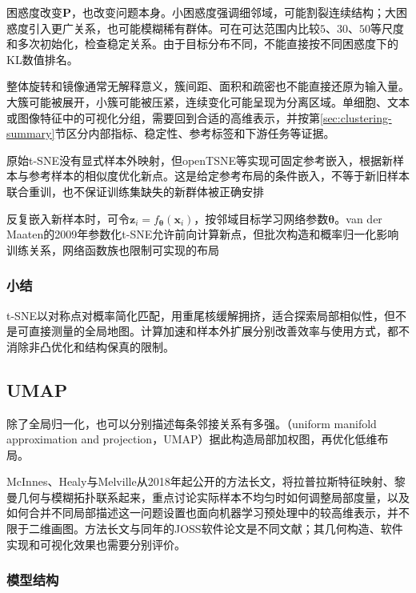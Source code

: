 困惑度改变$\bm{P}$，也改变问题本身。小困惑度强调细邻域，可能割裂连续结构；大困惑度引入更广关系，也可能模糊稀有群体。可在可达范围内比较$5$、$30$、$50$等尺度和多次初始化，检查稳定关系。由于目标分布不同，不能直接按不同困惑度下的KL数值排名。

整体旋转和镜像通常无解释意义，簇间距、面积和疏密也不能直接还原为输入量。大簇可能被展开，小簇可能被压紧，连续变化可能呈现为分离区域。单细胞、文本或图像特征中的可视化分组，需要回到合适的高维表示，并按第\ref{sec:clustering-summary}节区分内部指标、稳定性、参考标签和下游任务等证据。

原始t-SNE没有显式样本外映射，但openTSNE等实现可固定参考嵌入，根据新样本与参考样本的相似度优化新点。这是给定参考布局的条件嵌入，不等于新旧样本联合重训，也不保证训练集缺失的新群体被正确安排

反复嵌入新样本时，可令$\bm{z}_i=f_{\bm{\theta}}(\bm{x}_i)$，按邻域目标学习网络参数$\bm{\theta}$。van der Maaten的2009年参数化t-SNE允许前向计算新点，但批次构造和概率归一化影响训练关系，网络函数族也限制可实现的布局

\subsubsection{小结}

t-SNE以对称点对概率简化匹配，用重尾核缓解拥挤，适合探索局部相似性，但不是可直接测量的全局地图。计算加速和样本外扩展分别改善效率与使用方式，都不消除非凸优化和结构保真的限制。

\subsection{UMAP}
\label{sec:dim-umap}

除了全局归一化，也可以分别描述每条邻接关系有多强。（uniform manifold approximation and projection，UMAP）据此构造局部加权图，再优化低维布局。

McInnes、Healy与Melville从2018年起公开的方法长文，将拉普拉斯特征映射、黎曼几何与模糊拓扑联系起来，重点讨论实际样本不均匀时如何调整局部度量，以及如何合并不同局部描述这一问题设置也面向机器学习预处理中的较高维表示，并不限于二维画图。方法长文与同年的JOSS软件论文是不同文献；其几何构造、软件实现和可视化效果也需要分别评价。

\subsubsection{模型结构}

